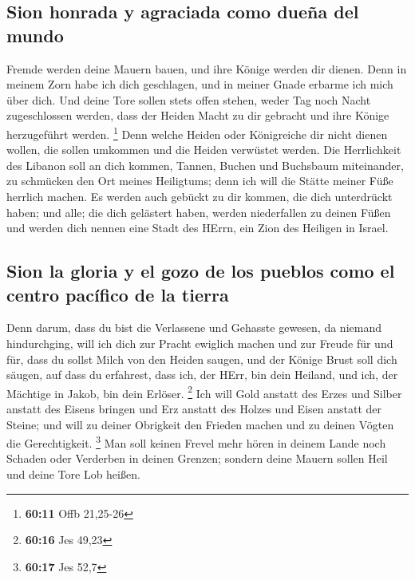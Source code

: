 \hypertarget{sion-honrada-y-agraciada-como-dueuxf1a-del-mundo}{%
\subsection{Sion honrada y agraciada como dueña del
mundo}\label{sion-honrada-y-agraciada-como-dueuxf1a-del-mundo}}

 Fremde werden deine Mauern bauen, und ihre Könige werden
dir dienen. Denn in meinem Zorn habe ich dich geschlagen, und in meiner
Gnade erbarme ich mich über dich.  Und deine Tore sollen
stets offen stehen, weder Tag noch Nacht zugeschlossen werden, dass der
Heiden Macht zu dir gebracht und ihre Könige herzugeführt werden.
\footnote{\textbf{60:11} Offb 21,25-26}  Denn welche
Heiden oder Königreiche dir nicht dienen wollen, die sollen umkommen und
die Heiden verwüstet werden.  Die Herrlichkeit des
Libanon soll an dich kommen, Tannen, Buchen und Buchsbaum miteinander,
zu schmücken den Ort meines Heiligtums; denn ich will die Stätte meiner
Füße herrlich machen.  Es werden auch gebückt zu dir
kommen, die dich unterdrückt haben; und alle; die dich gelästert haben,
werden niederfallen zu deinen Füßen und werden dich nennen eine Stadt
des HErrn, ein Zion des Heiligen in Israel.

\hypertarget{sion-la-gloria-y-el-gozo-de-los-pueblos-como-el-centro-pacuxedfico-de-la-tierra}{%
\subsection{Sion la gloria y el gozo de los pueblos como el centro
pacífico de la
tierra}\label{sion-la-gloria-y-el-gozo-de-los-pueblos-como-el-centro-pacuxedfico-de-la-tierra}}

 Denn darum, dass du bist die Verlassene und Gehasste
gewesen, da niemand hindurchging, will ich dich zur Pracht ewiglich
machen und zur Freude für und für,  dass du sollst Milch
von den Heiden saugen, und der Könige Brust soll dich säugen, auf dass
du erfahrest, dass ich, der HErr, bin dein Heiland, und ich, der
Mächtige in Jakob, bin dein Erlöser. \footnote{\textbf{60:16} Jes 49,23}
 Ich will Gold anstatt des Erzes und Silber anstatt des
Eisens bringen und Erz anstatt des Holzes und Eisen anstatt der Steine;
und will zu deiner Obrigkeit den Frieden machen und zu deinen Vögten die
Gerechtigkeit. \footnote{\textbf{60:17} Jes 52,7}  Man
soll keinen Frevel mehr hören in deinem Lande noch Schaden oder
Verderben in deinen Grenzen; sondern deine Mauern sollen Heil und deine
Tore Lob heißen.

